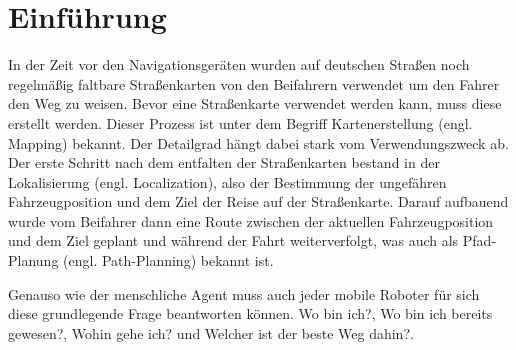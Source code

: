 \begin{comment}
------------------------------------------------------------------------------------------
- Lesen abholen und langsam an die Thematik heranführen.
- Sie soll gekonnt zum Thema hinführen und beim Leser ein Grundinteresse wecken.
- Es muss genau klar werden, welcher Erkenntnisgewinn von der Arbeit erwartet werden kann.
- Genauso müssen kurz die Ziele beschrieben werden, die man mit der Arbeit erreichen möchte, und welche Methoden dazu verwendet werden.
- Kann jemand nicht auf kleinem Raum deutlich machen, worüber er schreibt, aus welchem Grund und welche Ziele angestrebt werden, dann ist es nicht verwunderlich, dass sich das auch auf den Rest der Arbeit (negativ) auswirkt.
- Relevanz des Themas betonen
- Forschungsfrage vorstellen
- Erläutern der Vorgehensweise beim Beantworten der Forschungsfrage
- Erläuterung der Eingrenzung der Forschungsfrage
- Übersicht über Aufbau der Arbeit
- Unbedingt vermieden werden müssen persönliche Geständnisse und subjektive Meinungen: Dies gehört nie in eine Einleitung als Begründung für Themen- oder Methodikwahl und hat generell in wissenschaftlichen Arbeiten nichts zu suchen.
- Ferrein
	- Einleitung
	- allgemeine Einleitung in das Thema der Arbeit
	- Kurze Übersicht der Motivation und Problemstellung der Arbeit
	- Kurze Erläuterung des Lösungsansatzes
	- Überblick über die einzelnen Kapitel der Arbeit
\end{comment}
\chapter{Einführung}

In der Zeit vor den Navigationsgeräten wurden auf deutschen Straßen noch regelmäßig faltbare Straßenkarten von den Beifahrern verwendet um den Fahrer den Weg zu weisen. Bevor eine Straßenkarte verwendet werden kann, muss diese erstellt werden. Dieser Prozess ist unter dem Begriff Kartenerstellung (engl. Mapping) bekannt. Der Detailgrad hängt dabei stark vom Verwendungszweck ab. Der erste Schritt nach dem entfalten der Straßenkarten bestand in der Lokalisierung (engl. Localization), also der Bestimmung der ungefähren Fahrzeugposition und dem Ziel der Reise auf der Straßenkarte. Darauf aufbauend wurde vom Beifahrer dann eine Route zwischen der aktuellen Fahrzeugposition und dem Ziel geplant und während der Fahrt weiterverfolgt, was auch als Pfad-Planung (engl. Path-Planning) bekannt ist.

Genauso wie der menschliche Agent muss auch jeder mobile Roboter für sich diese grundlegende Frage beantworten können. \glqq Wo bin ich?\grqq{}, \glqq Wo bin ich bereits gewesen?\grqq, \glqq Wohin gehe ich?\grqq{} und \glqq Welcher ist der beste Weg dahin?\grqq{}\cite{murphy2000introduction}.

